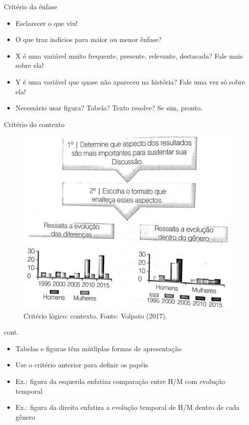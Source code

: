 \begin{frame}{Critério da ênfase}
\begin{itemize}
\item Esclarecer o que viu! 
\item O que traz indícios para maior ou menor ênfase? 
\item X é uma variável muito frequente, presente, relevante, destacada? Fale mais sobre ela!
\item Y é uma variável que quase não apareceu na história? Fale uma vez só sobre ela!\\
\item Necessário usar figura? Tabela? Texto resolve? Se sim, pronto. 
\end{itemize}
\end{frame}

\begin{frame}{Critério do contexto}
\begin{figure}
\centering
\includegraphics[scale=0.08]{figs/07/criterio-contexto}
\caption{Critério lógico: contexto. Fonte: Volpato (2017).}
\end{figure}
\end{frame}

\begin{frame}{cont.}
\begin{itemize}
\item Tabelas e figuras têm mútliplas formas de apresentação
\item Use o critério anterior para definir os papéis 
\item Ex.: figura da esquerda enfatiza comparação entre H/M com evolução temporal
\item Ex.: figura da direita enfatiza a evolução temporal de H/M dentro de cada gênero 
\end{itemize}
\end{frame}


